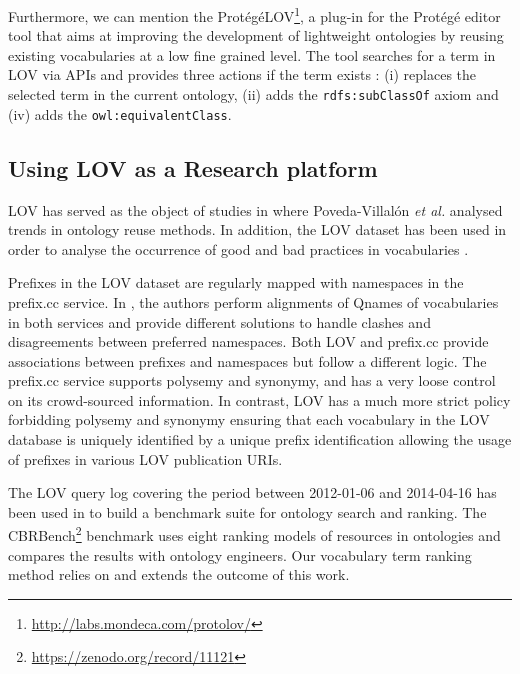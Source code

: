 \documentclass{iosart2c}
\begin{document}
Furthermore, we can mention the Prot{\'e}g{\'e}LOV\footnote{\url{http://labs.mondeca.com/protolov/}}, a plug-in for the Prot{\'e}g{\'e} editor tool \cite{prolov2015} that aims at improving the development of lightweight ontologies by reusing existing vocabularies at a low fine grained level. The tool searches for a term in LOV via APIs and provides three actions if the term exists : (i) replaces the selected term in the current ontology, (ii) adds the \texttt{rdfs:subClassOf} axiom and (iv) adds the \texttt{owl:equivalentClass}.

\subsection{Using LOV as a Research platform}

LOV has served as the object of studies in \cite{poveda2012landscape} where Poveda-Villal\'on \emph{et al.} analysed trends in ontology reuse methods. In addition, the LOV dataset has been used in order to analyse the occurrence of good and bad practices in vocabularies \cite{poveda2013detecting}.

Prefixes in the LOV dataset are regularly mapped with namespaces in the prefix.cc service. In \cite{wasabi13}, the authors perform alignments of Qnames of vocabularies in both services and provide different solutions to handle clashes and disagreements between preferred namespaces. Both  LOV and prefix.cc provide associations between prefixes and namespaces but follow a different logic. The prefix.cc service supports polysemy and synonymy, and has a very loose control on its crowd-sourced information. In contrast, LOV has a much more strict policy forbidding polysemy and synonymy ensuring that each vocabulary in the LOV database is uniquely identified by a unique prefix identification allowing the usage of prefixes in various LOV publication URIs. 

The LOV query log covering the period between 2012-01-06 and 2014-04-16 has been used in \cite{butt2014} to build a benchmark suite for ontology search and ranking. The CBRBench\footnote{\url{https://zenodo.org/record/11121}} benchmark uses eight ranking models of resources in ontologies and compares the results with ontology engineers. Our vocabulary term ranking method relies on and extends the outcome of this work.
\end{document}
